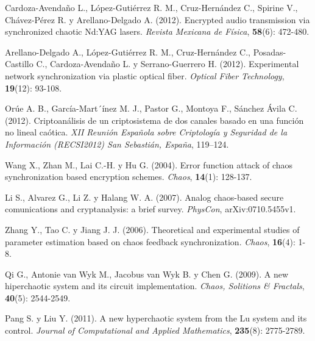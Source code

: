 \begin{thebibliography}{00}
Cardoza-Avendaño L., López-Gutiérrez R. M., Cruz-Hernández C., Spirine V., Chávez-Pérez R. y Arellano-Delgado A. (2012).
\newblock Encrypted audio transmission via synchronized chaotic Nd:YAG lasers.
\newblock \emph{Revista Mexicana de Física}, \textbf{58}(6): 472-480.

Arellano-Delgado A., López-Gutiérrez R. M., Cruz-Hernández C., Posadas-Castillo C., Cardoza-Avendaño L. y Serrano-Guerrero H. (2012).
\newblock Experimental network synchronization via plastic optical fiber.
\newblock \emph{Optical Fiber Technology}, \textbf{19}(12): 93-108.

Orúe A. B., García-Mart´ínez M. J., Pastor G., Montoya F., Sánchez Ávila C. (2012).
\newblock Criptoanálisis de un criptosistema de dos canales basado en una función no lineal caótica.
\newblock \emph{XII Reunión Española sobre Criptología y Seguridad de la Información (RECSI2012) San Sebastián, España}, 119–124.

Wang X., Zhan M., Lai C.-H. y Hu G. (2004).
\newblock Error function attack of chaos synchronization based encryption schemes.
\newblock \emph{Chaos}, \textbf{14}(1): 128-137.

Li S., Alvarez G., Li Z. y Halang W. A. (2007).
\newblock Analog chaos-based secure comunications and cryptanalysis: a brief survey.
\newblock \emph{PhysCon}, arXiv:0710.5455v1.

Zhang Y., Tao C. y Jiang J. J. (2006).
\newblock Theoretical and experimental studies of parameter estimation based on chaos feedback synchronization.
\newblock \emph{Chaos}, \textbf{16}(4): 1-8.

Qi G., Antonie van Wyk M., Jacobus van Wyk B. y Chen G. (2009).
\newblock A new hiperchaotic system and its circuit implementation.
\newblock \emph{Chaos, Solitions \& Fractals}, \textbf{40}(5): 2544-2549.

Pang S. y Liu Y. (2011).
\newblock A new hyperchaotic system from the Lu system and its control.
\newblock \emph{Journal of Computational and Applied Mathematics}, \textbf{235}(8): 2775-2789.


\end{thebibliography}

